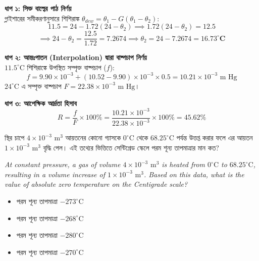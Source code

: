 \documentclass[12pt, a4paper]{article}
\begin{document}
\begin{tcolorbox}[solutionbox={সমাধান (Solution)}]
    \noindent
    \textbf{ধাপ ১: সিক্ত বাল্বের পাঠ নির্ণয়} \\
    গ্লাইশারের সমীকরণানুসারে শিশিরাঙ্ক $\theta_{dew} = \theta_1 - G (\theta_1 - \theta_2)$:
    \[ 11.5 = 24 - 1.72 (24 - \theta_2) \implies 1.72 (24 - \theta_2) = 12.5 \]
    \[ \implies 24 - \theta_2 = \frac{12.5}{1.72} = 7.2674 \implies \theta_2 = 24 - 7.2674 = \mathbf{16.73^\circ\text{C}} \]
    
    \vspace{0.4em}
    \noindent\textbf{ধাপ ২: আন্তঃপাতন (Interpolation) দ্বারা বাষ্পচাপ নির্ণয়} \\
    $11.5^\circ\text{C}$ শিশিরাঙ্কে উপস্থিত সম্পৃক্ত বাষ্পচাপ ($f$):
    \[ f = 9.90 \times 10^{-3} + (10.52 - 9.90) \times 10^{-3} \times 0.5 = 10.21 \times 10^{-3}\text{ m Hg} \]
    $24^\circ\text{C}$ এ সম্পৃক্ত বাষ্পচাপ $F = 22.38 \times 10^{-3}\text{ m Hg}$।
    
    \vspace{0.4em}
    \noindent\textbf{ধাপ ৩: আপেক্ষিক আর্দ্রতা হিসাব}
    \[ R = \frac{f}{F} \times 100\% = \frac{10.21 \times 10^{-3}}{22.38 \times 10^{-3}} \times 100\% = \mathbf{45.62\%} \]
\end{tcolorbox}

\vspace{2em}

\begin{tcolorbox}[questionbox={প্রশ্ন (Question) 7}]
    \noindent
    স্থির চাপে $4 \times 10^{-3}\text{ m}^3$ আয়তনের কোনো গ্যাসকে $0^\circ\text{C}$ থেকে $68.25^\circ\text{C}$ পর্যন্ত উত্তপ্ত করার ফলে এর আয়তন $1 \times 10^{-3}\text{ m}^3$ বৃদ্ধি পেল। এই তথ্যের ভিত্তিতে সেন্টিগ্রেড স্কেলে পরম শূন্য তাপমাত্রার মান কত?
    
    \vspace{0.8em}
    \begin{english}
    \noindent\textit{\color{darkgray}
    At constant pressure, a gas of volume $4 \times 10^{-3}\text{ m}^3$ is heated from $0^\circ\text{C}$ to $68.25^\circ\text{C}$, resulting in a volume increase of $1 \times 10^{-3}\text{ m}^3$. Based on this data, what is the value of absolute zero temperature on the Centigrade scale?
    }
    \end{english}
\end{tcolorbox}

\begin{itemize}[label={}, leftmargin=1cm, itemsep=0.5em]
    \item[\textbf{A)}] পরম শূন্য তাপমাত্রা $-273^\circ\text{C}$
    \item[\textbf{B)}] পরম শূন্য তাপমাত্রা $-268^\circ\text{C}$
    \item[\textbf{C)}] পরম শূন্য তাপমাত্রা $-280^\circ\text{C}$
    \item[\textbf{D)}] পরম শূন্য তাপমাত্রা $-270^\circ\text{C}$
\end{itemize}
\end{document}
